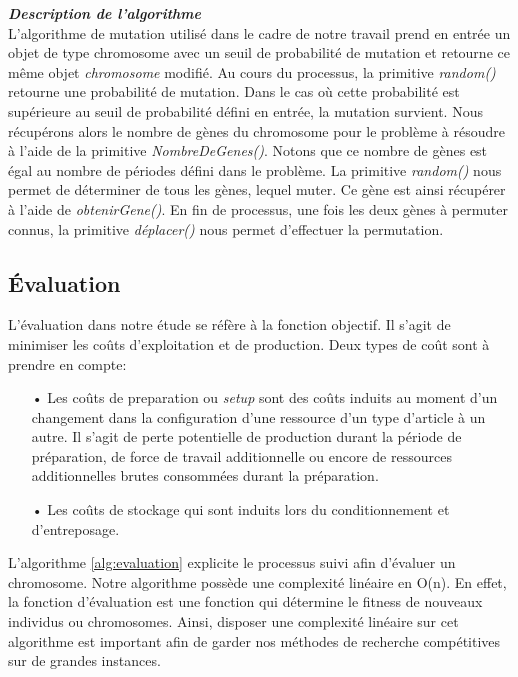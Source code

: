 	\vspace*{.3cm}		
	\hspace*{.5cm} \textbf{\textsl{Description de l'algorithme}} \\
	\hspace*{.5cm} L'algorithme de mutation utilisé dans le cadre de notre travail prend en entrée un objet de type chromosome avec un seuil de probabilité de mutation et retourne ce même objet \emph{chromosome} modifié. Au cours du processus, la primitive \emph{random()} retourne une probabilité de mutation. Dans le cas où cette probabilité est supérieure au seuil de probabilité défini en entrée, la mutation survient. Nous récupérons alors le nombre de gènes du chromosome pour le problème à résoudre à l'aide de la primitive \emph{NombreDeGenes()}. Notons que ce nombre de gènes est égal au nombre de périodes défini dans le problème. La primitive \emph{random()} nous permet de déterminer de tous les gènes, lequel muter. Ce gène est ainsi récupérer à l'aide de \emph{obtenirGene()}. En fin de processus, une fois les deux gènes à permuter connus, la primitive \emph{déplacer()} nous permet d'effectuer la permutation.
	
	
	
	\subsection{Évaluation}
	L'évaluation dans notre étude se réfère à la fonction objectif. Il s'agit de minimiser les coûts d'exploitation et de production. Deux types de coût sont à prendre en compte:
	\begin{itemize}
		\item[•] Les coûts de preparation ou \emph{setup} sont des coûts induits au moment d'un changement dans la configuration d'une ressource d'un type d'article à un autre. Il s'agit de perte potentielle de production durant la période de préparation, de force de travail additionnelle ou encore de ressources additionnelles brutes consommées durant la préparation.
		\item[•] Les coûts de stockage qui sont induits lors du conditionnement et d’entreposage.
	\end{itemize}
	L'algorithme \ref{alg:evaluation} explicite le processus suivi afin d'évaluer un chromosome. Notre algorithme possède une complexité linéaire en O(n). En effet, la fonction d'évaluation est une fonction qui détermine le fitness de nouveaux individus ou chromosomes. Ainsi, disposer une complexité linéaire sur cet algorithme est important afin de garder nos méthodes de recherche compétitives sur de grandes instances.
	
